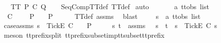 \begin{isabellebody}
\ \ \ {\isachardoublequoteopen}TT{}\ {\isacharparenleft}P\ {\isacharsemicolon}\isactrlsub C\ Q{\isacharparenright}{\isachardoublequoteclose}\isanewline
%
\isadelimproof
\ \ %
\endisadelimproof
%
\isatagproof
{}\isamarkupfalse%
\ SeqCompTT{\isacharunderscore}def\ TT{}{\isacharunderscore}def\isanewline
{}\isamarkupfalse%
\ {\isacharparenleft}auto{\isacharparenright}\isanewline
\ \ \isamarkupfalse%
\ {\isasymrho}\ {\isasymsigma}\ {\isacharcolon}{\isacharcolon}\ {\isachardoublequoteopen}{\isacharprime}a\ ttobs\ list{\isachardoublequoteclose}\isanewline
\ \ \isamarkupfalse%
\ {\isachardoublequoteopen}{\isasymrho}\ {\isasymlesssim}\isactrlsub C\ {\isasymsigma}\ {\isasymLongrightarrow}\ {\isasymsigma}\ {\isasymin}\ P\ {\isasymLongrightarrow}\ {\isasymrho}\ {\isasymin}\ P{\isachardoublequoteclose}\isanewline
\ \ \ \ \isamarkupfalse%
\ TT{}{\isacharunderscore}def\ assms{\isacharparenleft}{}{\isacharparenright}\ \isamarkupfalse%
\ blast\isanewline
{}\isamarkupfalse%
\isanewline
\ \ \isamarkupfalse%
\ {\isasymsigma}\ s\ {\isacharcolon}{\isacharcolon}\ {\isachardoublequoteopen}{\isacharprime}a\ ttobs\ list{\isachardoublequoteclose}\isanewline
\ \ \isamarkupfalse%
\ case{\isacharunderscore}assms{\isacharcolon}\ {\isachardoublequoteopen}s\ {\isacharat}\ {\isacharbrackleft}{\isacharbrackleft}Tick{\isacharbrackright}\isactrlsub E{\isacharbrackright}\ {\isasymlesssim}\isactrlsub C\ {\isasymsigma}{\isachardoublequoteclose}\ {\isachardoublequoteopen}{\isasymsigma}\ {\isasymin}\ P{\isachardoublequoteclose}\isanewline
\ \ \isamarkupfalse%
\ \isamarkupfalse%
\ s{\isacharprime}\ t\ \ {\isasymsigma}{\isacharunderscore}assms{\isacharcolon}\ {\isachardoublequoteopen}{\isasymsigma}\ {\isacharequal}\ s{\isacharprime}\ {\isacharat}\ t\ {\isasymand}\ s\ {\isacharat}\ {\isacharbrackleft}{\isacharbrackleft}Tick{\isacharbrackright}\isactrlsub E{\isacharbrackright}\ {\isasymsubseteq}\isactrlsub C\ s{\isacharprime}{\isachardoublequoteclose}\isanewline
\ \ \ \ \isamarkupfalse%
\ {\isacharparenleft}meson\ tt{\isacharunderscore}prefix{\isacharunderscore}split\ tt{\isacharunderscore}prefix{\isacharunderscore}subset{\isacharunderscore}imp{\isacharunderscore}tt{\isacharunderscore}subset{\isacharunderscore}tt{\isacharunderscore}prefix{\isacharparenright}\isanewline
\ \ \isamarkupfalse%
\ \isamarkupfalse%

\end{isabellebody}
